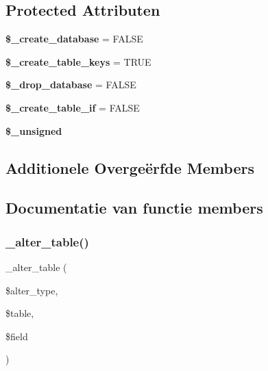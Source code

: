 \subsection*{Protected Attributen}
\begin{DoxyCompactItemize}
\item 
\mbox{\label{class_c_i___d_b__cubrid__forge_acd23c9a8735806155f1a5d0a87c151f2}} 
{\bfseries \$\+\_\+create\+\_\+database} = F\+A\+L\+SE
\item 
\mbox{\label{class_c_i___d_b__cubrid__forge_a73e07acdd35c948ad353903c2827af6e}} 
{\bfseries \$\+\_\+create\+\_\+table\+\_\+keys} = T\+R\+UE
\item 
\mbox{\label{class_c_i___d_b__cubrid__forge_a8305b12fc17f6f87778260ebdff287b4}} 
{\bfseries \$\+\_\+drop\+\_\+database} = F\+A\+L\+SE
\item 
\mbox{\label{class_c_i___d_b__cubrid__forge_a2f6484fcb8d1dc3eef67a637227cd583}} 
{\bfseries \$\+\_\+create\+\_\+table\+\_\+if} = F\+A\+L\+SE
\item 
{\bfseries \$\+\_\+unsigned}
\end{DoxyCompactItemize}
\subsection*{Additionele Overge\"{e}rfde Members}


\subsection{Documentatie van functie members}
\mbox{\label{class_c_i___d_b__cubrid__forge_a41c6cae02f2fda8b429ad0afb9509426}} 
\subsubsection{\texorpdfstring{\_alter\_table()}{\_alter\_table()}}
{\footnotesize\ttfamily \+\_\+alter\+\_\+table (\begin{DoxyParamCaption}\item[{}]{\$alter\+\_\+type,  }\item[{}]{\$table,  }\item[{}]{\$field }\end{DoxyParamCaption})\hspace{0.3cm}{\ttfamily [protected]}}

